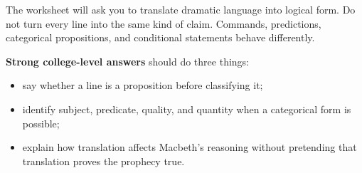 \documentclass[12pt]{article}
\begin{document}
The worksheet will ask you to translate dramatic language into logical form. Do not turn every line into the same kind of claim. Commands, predictions, categorical propositions, and conditional statements behave differently.

\textbf{Strong college-level answers} should do three things:

\begin{itemize}[leftmargin=1.5em,itemsep=0.2em]
\item say whether a line is a proposition before classifying it;
\item identify subject, predicate, quality, and quantity when a categorical form is possible;
\item explain how translation affects Macbeth's reasoning without pretending that translation proves the prophecy true.
\end{itemize}
\end{document}
